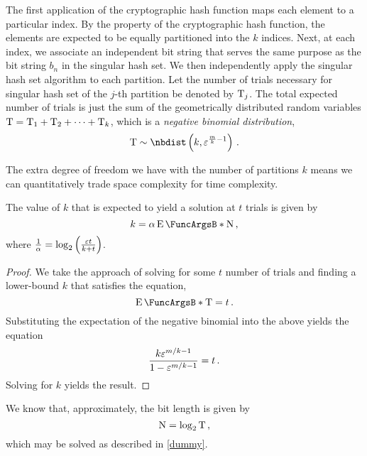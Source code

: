 \documentclass[ ../main.tex]{subfiles}
\begin{document}
The first application of the cryptographic hash function maps each element to a particular index.
By the property of the cryptographic hash function, the elements are expected to be equally partitioned into the $k$ indices.
Next, at each index, we associate an independent bit string that serves the same purpose as the bit string $b_n$ in the singular hash set.
We then independently apply the singular hash set algorithm to each partition.
Let the number of trials necessary for singular hash set of the $j$-th partition be denoted by $\mathrm{T}_j$.
The total expected number of trials is just the sum of the geometrically distributed random variables $\mathrm{T} = \mathrm{T}_1 + \mathrm{T}_2 + \cdots + \mathrm{T}_k$, which is a \emph{negative binomial distribution},
\begin{equation}
    \RV{T} \sim \nbdist\left(k, \fprate^{\frac{m}{k}-1}\right)\,.
\end{equation}

The extra degree of freedom we have with the number of partitions $k$ means we can quantitatively trade space complexity for time complexity.
\begin{theorem}
    The value of $k$ that is expected to yield a solution at $t$ trials is given by
    \begin{equation}
        k = \alpha \Expect{\RV{N}}\,,
    \end{equation}
    where $\frac{1}{\alpha} = \log_2 \left(\frac{\varepsilon t}{k + t}\right)$.
\end{theorem}
\begin{proof}
    We take the approach of solving for some $t$ number of trials and finding a lower-bound $k$ that satisfies the equation,
    \begin{equation}
        \Expect{\RV{T}} = t\,.
    \end{equation}
    Substituting the expectation of the negative binomial into the above yields the equation
    \begin{equation}
        \frac{k \varepsilon^{m/k-1}}{1-\varepsilon^{m/k-1}} = t\,.
    \end{equation}
    Solving for $k$ yields the result.
\end{proof}

We know that, approximately, the bit length is given by
\begin{equation}
    \mathrm{N} = \log_2 \mathrm{T}\,,
\end{equation}
which may be solved as described in \cref{dummy}.
\end{document}
